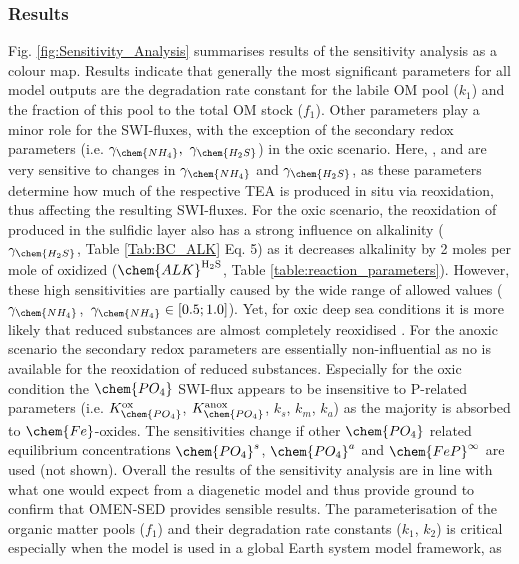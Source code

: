 \documentclass[gmd, manuscript]{copernicus}
\begin{document}
\subsubsection{Results}
Fig. \ref{fig:Sensitivity_Analysis} summarises results of the sensitivity analysis as a colour map. 
Results indicate that generally the most significant parameters for all model outputs are the degradation rate constant for the labile OM pool ($k_1$) and the fraction of this pool to the total OM stock ($f_1$). 
Other parameters play a minor role for the SWI-fluxes, with the exception of the secondary redox parameters (i.e. $\gamma_\chem{NH_4},\ \gamma_\chem{H_2S}$) in the oxic scenario.
Here, ,  and  are very sensitive to changes in $\gamma_\chem{NH_4}$ and $\gamma_\chem{H_2S}$, as these parameters determine how much of the respective TEA is produced in situ via reoxidation, 
thus affecting the resulting SWI-fluxes. 
For the oxic scenario, the reoxidation of  produced in the sulfidic layer also has a strong influence on alkalinity ($\gamma_\chem{H_2S}$, Table \ref{Tab:BC_ALK} Eq. 5) 
as it decreases alkalinity by 2 moles per mole of  oxidized ($\chem{ALK}^\mathrm{H_2S}$, Table \ref{table:reaction_parameters}). 
However, these high sensitivities are partially caused by the wide range of allowed values ($\gamma_{\chem{NH_4}}$,\ $\gamma_{\chem{NH_4}} \in [0.5; 1.0]$). Yet, for oxic deep sea conditions it is more
likely that reduced substances are almost completely reoxidised \citep[e.g.][]{hensen_benthic_2006}. 
For the anoxic scenario the secondary redox parameters are essentially non-influential as no  is available for the reoxidation of reduced substances. 
Especially for the oxic condition the $\chem{PO_4}$ SWI-flux appears to be insensitive to P-related parameters (i.e. $K_\chem{PO_4}^\mathrm{ox}$, $K_\chem{PO_4}^\mathrm{anox}$, $k_s$, $k_m$, $k_a$) as the majority is absorbed to $\chem{Fe}$-oxides. 
The sensitivities change if other $\chem{PO_4}$ related equilibrium concentrations $\chem{PO_4}^s$, $\chem{PO_4}^a$ and $\chem{FeP}^\infty$ are used (not shown).
Overall the results of the sensitivity analysis are in line with what one would expect from a diagenetic model and thus provide ground to confirm that OMEN-SED provides sensible results.
The parameterisation of the organic matter pools ($f_1$) and their degradation rate constants ($k_1$, $k_2$) is critical especially when the model is used in a global Earth system model framework, as 
\end{document}
